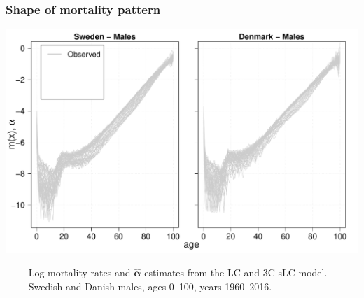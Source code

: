 \documentclass[12pt, xcolor=table]{beamer}  %
\begin{document}
\begin{frame}          
	\frametitle{Shape of mortality pattern}
	\begin{center}
		\includegraphics[scale=0.41]{Figures/Ch5/Alpha1}
	\end{center}

\vspace{-0.35cm}
\tiny{$\quad\quad$ Log-mortality rates and $\bm{\hat{\alpha}}$ estimates from the LC and 3C-sLC model. \\ $\quad\quad$ Swedish and Danish males, ages 0--100, years 1960--2016.}

	
\end{frame}
\end{document}

